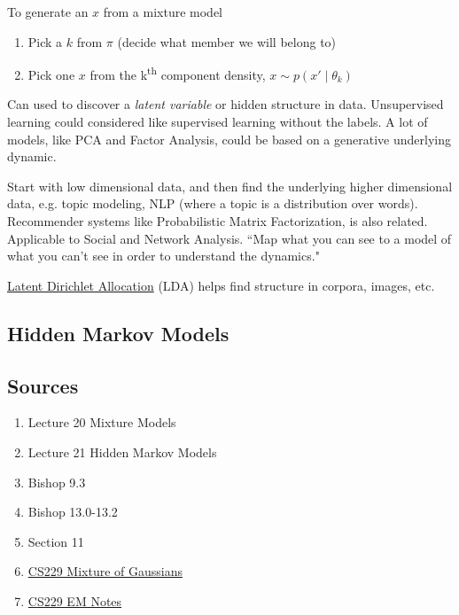 \documentclass[11pt, oneside]{article}   	%
\begin{document}
To generate an $x$ from a mixture model
\begin{enumerate}
	\item Pick a $k$ from $\pi$ (decide what member we will belong to)
	\item Pick one $x$ from the k\textsuperscript{th} component density, $x \sim p(x' \mid \theta_k)$
\end{enumerate}

Can used to discover a \emph{latent variable}  or hidden structure in data. Unsupervised learning could considered like supervised learning without the labels. A lot of models, like PCA and Factor Analysis, could be based on a generative underlying dynamic. 

Start with low dimensional data, and then find the underlying higher dimensional data, e.g. topic modeling, NLP (where a topic is a distribution over words).  Recommender systems like Probabilistic Matrix Factorization, is also related. Applicable to Social and Network Analysis. ``Map what you can see to a model of what you can't see in order to understand the dynamics."

\href{http://en.wikipedia.org/wiki/Latent_Dirichlet_allocation}{Latent Dirichlet Allocation} (LDA) helps find structure in corpora, images, etc.

\subsection{Hidden Markov Models}

\subsection{Sources}

\begin{enumerate}
	\item Lecture 20 Mixture Models
	\item Lecture 21 Hidden Markov Models
	\item Bishop 9.3
	\item Bishop 13.0-13.2
	\item Section 11
	\item \href{http://cs229.stanford.edu/notes/cs229-notes7b.pdf}{CS229 Mixture of Gaussians}
	\item \href{http://cs229.stanford.edu/notes/cs229-notes8.pdf}{CS229 EM Notes}
\end{enumerate}
\end{document}
